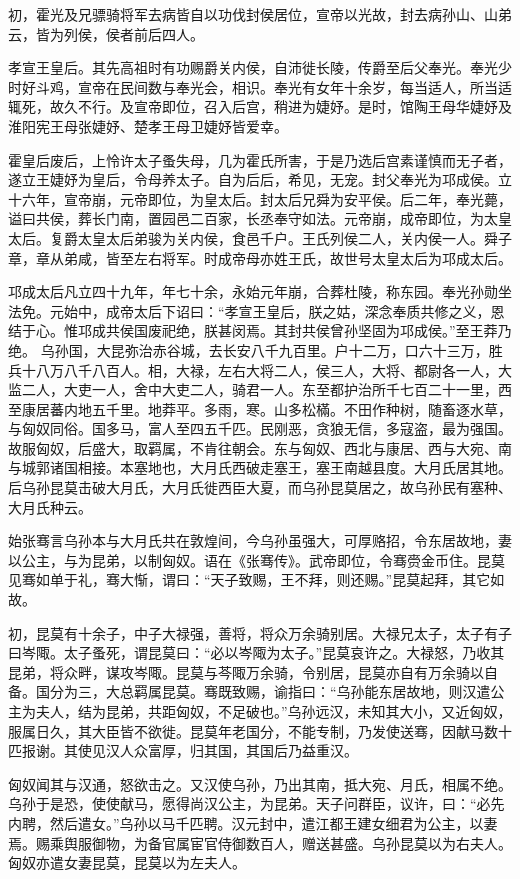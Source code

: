 \documentclass[]{article}
\begin{document}
初，霍光及兄骠骑将军去病皆自以功伐封侯居位，宣帝以光故，封去病孙山、山弟云，皆为列侯，侯者前后四人。

孝宣王皇后。其先高祖时有功赐爵关内侯，自沛徙长陵，传爵至后父奉光。奉光少时好斗鸡，宣帝在民间数与奉光会，相识。奉光有女年十余岁，每当适人，所当适辄死，故久不行。及宣帝即位，召入后宫，稍进为婕妤。是时，馆陶王母华婕妤及淮阳宪王母张婕妤、楚孝王母卫婕妤皆爱幸。

霍皇后废后，上怜许太子蚤失母，几为霍氏所害，于是乃选后宫素谨慎而无子者，遂立王婕妤为皇后，令母养太子。自为后后，希见，无宠。封父奉光为邛成侯。立十六年，宣帝崩，元帝即位，为皇太后。封太后兄舜为安平侯。后二年，奉光薨，谥曰共侯，葬长门南，置园邑二百家，长丞奉守如法。元帝崩，成帝即位，为太皇太后。复爵太皇太后弟骏为关内侯，食邑千户。王氏列侯二人，关内侯一人。舜子章，章从弟咸，皆至左右将军。时成帝母亦姓王氏，故世号太皇太后为邛成太后。

邛成太后凡立四十九年，年七十余，永始元年崩，合葬杜陵，称东园。奉光孙勋坐法免。元始中，成帝太后下诏曰：``孝宣王皇后，朕之姑，深念奉质共修之义，恩结于心。惟邛成共侯国废祀绝，朕甚闵焉。其封共侯曾孙坚固为邛成侯。''至王莽乃绝。
乌孙国，大昆弥治赤谷城，去长安八千九百里。户十二万，口六十三万，胜兵十八万八千八百人。相，大禄，左右大将二人，侯三人，大将、都尉各一人，大监二人，大吏一人，舍中大吏二人，骑君一人。东至都护治所千七百二十一里，西至康居蕃内地五千里。地莽平。多雨，寒。山多松樠。不田作种树，随畜逐水草，与匈奴同俗。国多马，富人至四五千匹。民刚恶，贪狼无信，多寇盗，最为强国。故服匈奴，后盛大，取羁属，不肯往朝会。东与匈奴、西北与康居、西与大宛、南与城郭诸国相接。本塞地也，大月氏西破走塞王，塞王南越县度。大月氏居其地。后乌孙昆莫击破大月氏，大月氏徙西臣大夏，而乌孙昆莫居之，故乌孙民有塞种、大月氏种云。

始张骞言乌孙本与大月氏共在敦煌间，今乌孙虽强大，可厚赂招，令东居故地，妻以公主，与为昆弟，以制匈奴。语在《张骞传》。武帝即位，令骞赍金币住。昆莫见骞如单于礼，骞大惭，谓曰：``天子致赐，王不拜，则还赐。''昆莫起拜，其它如故。

初，昆莫有十余子，中子大禄强，善将，将众万余骑别居。大禄兄太子，太子有子曰岑陬。太子蚤死，谓昆莫曰：``必以岑陬为太子。''昆莫哀许之。大禄怒，乃收其昆弟，将众畔，谋攻岑陬。昆莫与芩陬万余骑，令别居，昆莫亦自有万余骑以自备。国分为三，大总羁属昆莫。骞既致赐，谕指曰：``乌孙能东居故地，则汉遣公主为夫人，结为昆弟，共距匈奴，不足破也。''乌孙远汉，未知其大小，又近匈奴，服属日久，其大臣皆不欲徙。昆莫年老国分，不能专制，乃发使送骞，因献马数十匹报谢。其使见汉人众富厚，归其国，其国后乃益重汉。

匈奴闻其与汉通，怒欲击之。又汉使乌孙，乃出其南，抵大宛、月氏，相属不绝。乌孙于是恐，使使献马，愿得尚汉公主，为昆弟。天子问群臣，议许，曰：``必先内聘，然后遣女。''乌孙以马千匹聘。汉元封中，遣江都王建女细君为公主，以妻焉。赐乘舆服御物，为备官属宦官侍御数百人，赠送甚盛。乌孙昆莫以为右夫人。匈奴亦遣女妻昆莫，昆莫以为左夫人。
\end{document}

